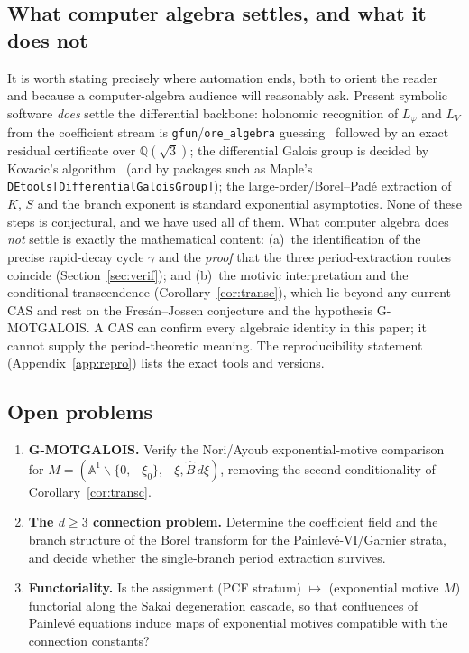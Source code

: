 \documentclass[11pt,reqno]{amsart}
\theoremstyle{plain}
\theoremstyle{definition}
\newcommand{\Bhat}{\widehat{B}}
\newcommand{\Lphi}{L_{\varphi}}
\newcommand{\LV}{L_{V}}
\newcommand{\Qsqrt}{\mathbb{Q}(\sqrt3)}
\newcommand{\xizero}{\xi_0}
\begin{document}
\subsection{What computer algebra settles, and what it does not}
It is worth stating precisely where automation ends, both to orient the reader and because a
computer-algebra audience will reasonably ask. Present symbolic software \emph{does} settle the
differential backbone: holonomic recognition of $\Lphi$ and $\LV$ from the coefficient stream is
\texttt{gfun}/\texttt{ore\_algebra} guessing~\cite{gfun,oreAlgebra} followed by an exact residual
certificate over $\Qsqrt$; the differential Galois group is decided by Kovacic's
algorithm~\cite{Kovacic} (and by packages such as Maple's
\texttt{DEtools[DifferentialGaloisGroup]}); the large-order/Borel--Pad\'e extraction of $K$, $S$
and the branch exponent is standard exponential asymptotics. None of these steps is conjectural,
and we have used all of them. What computer algebra does \emph{not} settle is exactly the
mathematical content: (a)~the identification of the precise rapid-decay cycle $\gamma$ and the
\emph{proof} that the three period-extraction routes coincide (Section~\ref{sec:verif}); and
(b)~the motivic interpretation and the conditional transcendence
(Corollary~\ref{cor:transc}), which lie beyond any current CAS and rest on the Fres\'an--Jossen
conjecture and the hypothesis G-MOTGALOIS. A CAS can confirm every algebraic identity in this
paper; it cannot supply the period-theoretic meaning. The reproducibility statement
(Appendix~\ref{app:repro}) lists the exact tools and versions.

\subsection{Open problems}
\begin{enumerate}[leftmargin=1.6em,itemsep=2pt]
  \item \textbf{G-MOTGALOIS.} Verify the Nori/Ayoub exponential-motive comparison for
        $M=(\mathbb{A}^1\smallsetminus\{0,-\xizero\},-\xi,\Bhat\,d\xi)$, removing the second
        conditionality of Corollary~\ref{cor:transc}.
  \item \textbf{The $d\ge3$ connection problem.} Determine the coefficient field and the branch
        structure of the Borel transform for the Painlev\'e-VI/Garnier strata, and decide whether
        the single-branch period extraction survives.
  \item \textbf{Functoriality.} Is the assignment (PCF stratum) $\mapsto$ (exponential motive
        $M$) functorial along the Sakai degeneration cascade, so that confluences of Painlev\'e
        equations induce maps of exponential motives compatible with the connection constants?
\end{enumerate}
\end{document}

